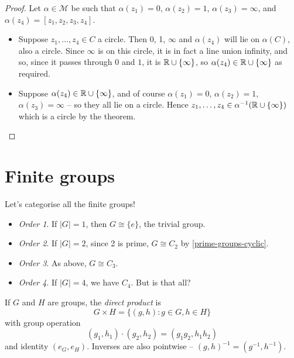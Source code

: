 \documentclass{../template/note}
\begin{document}
    \begin{proof}
        Let \(\alpha \in \mathcal M\) be such that \(\alpha(z_1) = 0\), \(\alpha(z_2) = 1\), \(\alpha(z_3) = \infty\), and \(\alpha(z_4) = [z_1, z_2, z_3, z_4]\).
        \begin{itemize}
            \item[\(\implies\)] Suppose \(z_1, \dots, z_4 \in C\) a circle. Then 0, 1, \(\infty\) and \(\alpha(z_4)\) will lie on \(\alpha(C)\), also a circle. Since \(\infty\) is on this circle, it is in fact a line union infinity, and so, since it passes through \(0\) and \(1\), it is \(\mathbb R \cup \{\infty\}\), so \(\alpha(z_4) \in \mathbb R \cup \{\infty\}\) as required.
            \item[\(\impliedby\)] Suppose \(\alpha(z_4) \in \mathbb R \cup \{\infty\}\), and of course \(\alpha(z_1) = 0\), \(\alpha(z_2) = 1\), \(\alpha(z_3) = \infty\) -- so they all lie on a circle. Hence \(z_1, \dots, z_4 \in \alpha^{-1}(\mathbb R \cup \{\infty\})\) which is a circle by the theorem. 
        \end{itemize} 
    \end{proof}
    
    \section{Finite groups}
    
    Let's categorise all the finite groups!


    \begin{itemize}
        \item \emph{Order 1}. If \(|G| = 1\), then \(G \cong \{e\}\), the trivial group.
        \item \emph{Order 2}. If \(|G| = 2\), since 2 is prime, \(G \cong C_2\) by \cref{prime-groups-cyclic}.
        \item \emph{Order 3}. As above, \(G \cong C_3\).
        \item \emph{Order 4}. If \(|G| = 4\), we have \(C_4\). But is that all?
    \end{itemize}

    \begin{definition}
        If \(G\) and \(H\) are groups, the \emph{direct product} is
        \[
            G \times H = \{(g, h): g \in G, h \in H\}
        \]
        with group operation
        \[
            (g_1, h_1) \cdot (g_2, h_2) = (g_1g_2, h_1h_2)
        \]
        and identity \((e_G, e_H)\). Inverses are also pointwise -- \((g, h)^{-1} = (g^{-1}, h^{-1})\).
    \end{definition}
    
\end{document}
